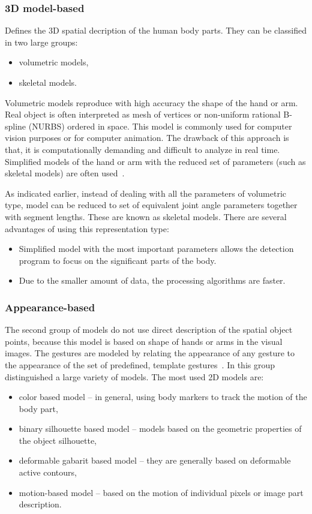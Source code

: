 \subsubsection*{3D model-based}

Defines the 3D spatial decription of the human body parts. They can be classified in two large groups:
\begin{itemize}
\item volumetric models,
\item skeletal models.
\end{itemize}
Volumetric models reproduce with high accuracy the shape of the hand or arm. Real object is often interpreted as mesh of vertices or non-uniform rational B-spline (NURBS) ordered in space. This model is commonly used for computer vision purposes or for computer animation. The drawback of this approach is that, it is computationally demanding and difficult to analyze in real time. Simplified models of the hand or arm with the reduced set of parameters (such as skeletal models) are often used~\cite{Pavlovic97visualinterpretation}.

As indicated earlier, instead of dealing with all the parameters of volumetric type, model can be reduced to set of equivalent joint angle parameters together with segment lengths. These are known as skeletal models. There are several advantages of using this representation type:
\begin{itemize}
\item Simplified model with the most important parameters allows the detection program to focus on the significant parts of the body.
\item Due to the smaller amount of data, the processing algorithms are faster.
\end{itemize}

\subsubsection*{Appearance-based}

The second group of models do not use direct description of the spatial object points, because this model is based on shape of hands or arms in the visual images. The gestures are modeled by relating the appearance of any gesture to the appearance of the set of predefined, template gestures~\cite{Pavlovic97visualinterpretation}. In this group distinguished a large variety of models. The most used 2D models are:
\begin{itemize}
\item color based model -- in general, using body markers to track the motion of the body part,
\item binary silhouette based model -- models based on the geometric properties of the object silhouette,
\item deformable gabarit based model -- they are generally based on deformable active contours,
\item motion-based model -- based on the motion of individual pixels or image part description.
\end{itemize}

